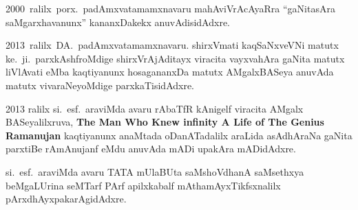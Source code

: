 {\rm 2000}~ralilx~porx.~padAmxvatamamxnavaru mahAviVrAcAyaRra ``gaNitasAra saMgarxhavanunx'' kananxDakekx anuvAdisidAdxre.

{\rm 2013}~ralilx~DA.~padAmxvatamamxnavaru. shirxVmati kaqSaNxveVNi matutx ke.~ji.~parxkAshf\-roMdige shirxVrAjAditayx viracita vayxvahAra gaNita matutx liVlAvati eMba kaqtiyanunx hosagananxDa matutx AMgalxBASeya anuvAda matutx vivaraNeyoMdige parxkaTisidAdxre.

{\rm 2013} ralilx si.~esf.~araviMda avaru rAbaTfR kAnigelf viracita AMgalx BASeyalilxruva,
{\bf\rm The Man Who Knew infinity A Life of The Genius Ramanujan} kaqtiyanunx anaMtada oDanATadalilx araLida asAdhAraNa gaNita parxtiBe rAmAnujanf eMdu anuvAda mADi upakAra mADidAdxre.

si.~esf.~araviMda avaru TATA mUlaBUta saMshoVdhanA saMsethxya beMgaLUrina seMTarf PArf apilxkabalf mAthamAyxTikfsxnalilx pArxdhAyxpakarAgidAdxre.

